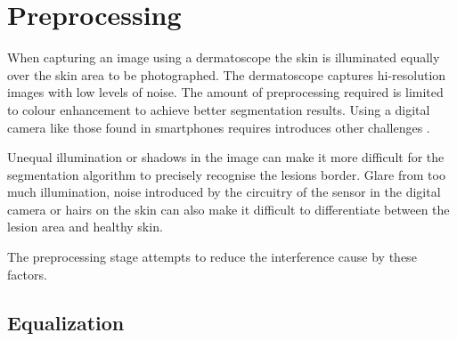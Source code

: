 \section{Preprocessing}

When capturing an image using a dermatoscope the skin is illuminated equally over the skin area to be photographed. The dermatoscope captures hi-resolution images with low levels of noise. The amount of preprocessing required is limited to colour enhancement to achieve better segmentation results. Using a digital camera like those found in smartphones requires introduces other challenges \cite{auto_seg}.

Unequal illumination or shadows in the image can make it more difficult for the segmentation algorithm to precisely recognise the lesions border. Glare from too much illumination, noise introduced by the circuitry of the sensor in the digital camera or hairs on the skin can also make it difficult to differentiate between the lesion area and healthy skin.

The preprocessing stage attempts to reduce the interference cause by these factors.


\subsection{Equalization}

